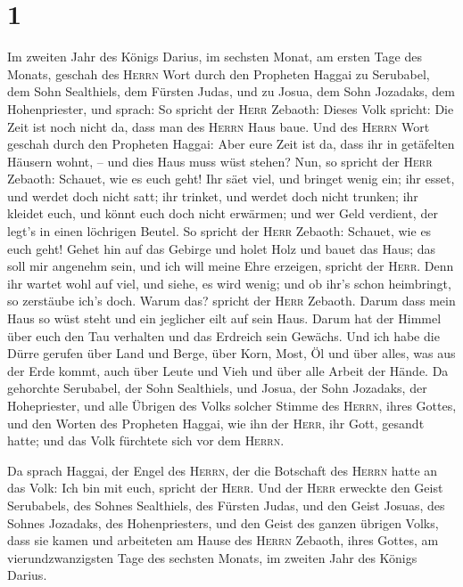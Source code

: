 \hypertarget{section}{%
\section{1}\label{section}}

 Im zweiten Jahr des Königs Darius, im sechsten Monat, am
ersten Tage des Monats, geschah des \textsc{Herrn} Wort durch den
Propheten Haggai zu Serubabel, dem Sohn Sealthiels, dem Fürsten Judas,
und zu Josua, dem Sohn Jozadaks, dem Hohenpriester, und sprach:
 So spricht der \textsc{Herr} Zebaoth: Dieses Volk
spricht: Die Zeit ist noch nicht da, dass man des \textsc{Herrn} Haus
baue.  Und des \textsc{Herrn} Wort geschah durch den
Propheten Haggai:  Aber eure Zeit ist da, dass ihr in
getäfelten Häusern wohnt, -- und dies Haus muss wüst stehen?
 Nun, so spricht der \textsc{Herr} Zebaoth: Schauet, wie
es euch geht!  Ihr säet viel, und bringet wenig ein; ihr
esset, und werdet doch nicht satt; ihr trinket, und werdet doch nicht
trunken; ihr kleidet euch, und könnt euch doch nicht erwärmen; und wer
Geld verdient, der legt's in einen löchrigen Beutel.  So
spricht der \textsc{Herr} Zebaoth: Schauet, wie es euch geht!
 Gehet hin auf das Gebirge und holet Holz und bauet das
Haus; das soll mir angenehm sein, und ich will meine Ehre erzeigen,
spricht der \textsc{Herr}.  Denn ihr wartet wohl auf viel,
und siehe, es wird wenig; und ob ihr's schon heimbringt, so zerstäube
ich's doch. Warum das? spricht der \textsc{Herr} Zebaoth. Darum dass
mein Haus so wüst steht und ein jeglicher eilt auf sein Haus.
 Darum hat der Himmel über euch den Tau verhalten und das
Erdreich sein Gewächs.  Und ich habe die Dürre gerufen
über Land und Berge, über Korn, Most, Öl und über alles, was aus der
Erde kommt, auch über Leute und Vieh und über alle Arbeit der Hände.
 Da gehorchte Serubabel, der Sohn Sealthiels, und Josua,
der Sohn Jozadaks, der Hohepriester, und alle Übrigen des Volks solcher
Stimme des \textsc{Herrn}, ihres Gottes, und den Worten des Propheten
Haggai, wie ihn der \textsc{Herr}, ihr Gott, gesandt hatte; und das Volk
fürchtete sich vor dem \textsc{Herrn}.

 Da sprach Haggai, der Engel des \textsc{Herrn}, der die
Botschaft des \textsc{Herrn} hatte an das Volk: Ich bin mit euch,
spricht der \textsc{Herr}.  Und der \textsc{Herr}
erweckte den Geist Serubabels, des Sohnes Sealthiels, des Fürsten Judas,
und den Geist Josuas, des Sohnes Jozadaks, des Hohenpriesters, und den
Geist des ganzen übrigen Volks, dass sie kamen und arbeiteten am Hause
des \textsc{Herrn} Zebaoth, ihres Gottes,  am
vierundzwanzigsten Tage des sechsten Monats, im zweiten Jahr des Königs
Darius.

